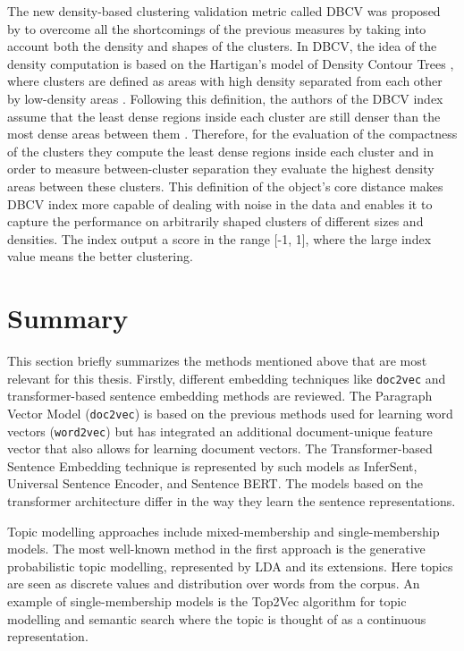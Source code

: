 \documentclass[fontsize=12pt,a4paper,twoside,openany]{scrbook}
\begin{document}
The new density-based clustering validation metric called DBCV was proposed by \textcite{Moulavi14} to overcome all the shortcomings of the previous measures by taking into account both the density and shapes of the clusters. In DBCV, the idea of the density computation is based on the Hartigan’s model of Density Contour Trees \parencite{Hartigan75}, where clusters are defined as areas with high density separated from each other by low-density areas \parencite{Moulavi14, Hartigan75}. Following this definition, the authors of the DBCV index assume that the least dense regions inside each cluster are still denser than the most dense areas between them \parencite{Moulavi14}. Therefore, for the evaluation of the compactness of the clusters they compute the least dense regions inside each cluster and in order to measure between-cluster separation they evaluate the highest density areas between these clusters. This definition of the object's core distance makes DBCV index more capable of dealing with noise in the data and enables it to capture the performance on arbitrarily shaped clusters of different sizes and densities. The index output a score in the range [-1, 1], where the large index value means the better clustering.

\section{Summary}
This section briefly summarizes the methods mentioned above that are most relevant for this thesis. Firstly, different embedding techniques like \verb|doc2vec| and transformer-based sentence embedding methods are reviewed. The Paragraph Vector Model (\verb|doc2vec|) is based on the previous methods used for learning word vectors (\verb|word2vec|) but has integrated an additional document-unique feature vector that also allows for learning document vectors. The Transformer-based Sentence Embedding technique is represented by such models as InferSent, Universal Sentence Encoder, and Sentence BERT. The models based on the transformer architecture differ in the way they learn the sentence representations.

Topic modelling approaches include mixed-membership and single-membership models. The most well-known method in the first approach is the generative probabilistic topic modelling, represented by LDA and its extensions. Here topics are seen as discrete values and distribution over words from the corpus. An example of single-membership models is the Top2Vec algorithm for topic modelling and semantic search where the topic is thought of as a continuous representation.
\end{document}
